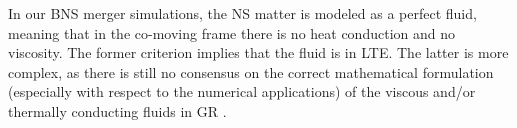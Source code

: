 %
In our \ac{BNS} merger simulations, the \ac{NS} matter is modeled as a perfect fluid, 
meaning that in the co-moving frame 
there is no heat conduction and no viscosity. The former criterion implies that the fluid is in \ac{LTE}. 
The latter is more complex, as there is still no consensus on the correct mathematical formulation 
(especially with respect to the numerical applications) of the viscous and/or thermally conducting fluids in 
\ac{GR} \citep[\eg][]{Andersson:2006nr}. 

%
%

